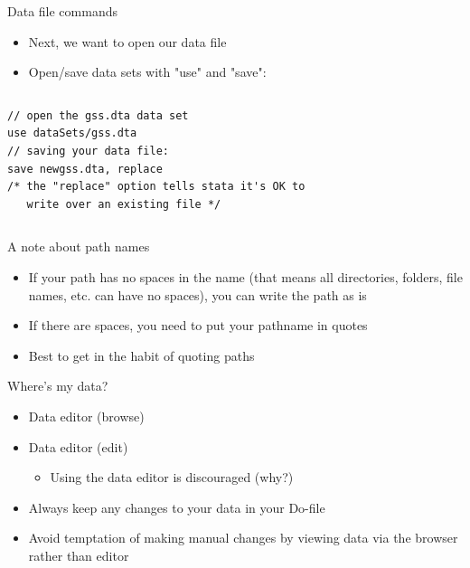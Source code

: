 \documentclass[table,smaller]{beamer}
\begin{document}
\begin{frame}[fragile,label=sec-2-1]{Data file commands}
 \begin{itemize}
\item Next, we want to open our data file
\item Open/save data sets with "use" and "save":
\end{itemize}

\vspace{-.5em} \begin{columns}  \begin{block}{}
\begin{verbatim}
// open the gss.dta data set
use dataSets/gss.dta
// saving your data file:
save newgss.dta, replace
/* the "replace" option tells stata it's OK to 
   write over an existing file */
\end{verbatim}

\end{block} \end{columns}
\end{frame}
\begin{frame}[label=sec-2-2]{A note about path names}
\begin{itemize}
\item If your path has no spaces in the name (that means all directories, folders, file names, etc. can have no spaces), you can write the path as is
\item If there are spaces, you need to put your pathname in quotes
\item Best to get in the habit of quoting paths
\end{itemize}
\end{frame}
\begin{frame}[label=sec-2-3]{Where's my data?}
\begin{itemize}
\item Data editor (\alert{browse})
\item Data editor (\alert{edit})
\begin{itemize}
\item Using the data editor is discouraged (why?)
\end{itemize}
\item Always keep any changes to your data in your Do-file
\item Avoid temptation of making manual changes by viewing data via the browser rather than editor
\end{itemize}
\end{frame}
\end{document}
